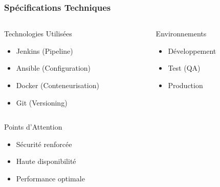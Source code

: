 \documentclass[aspectratio=169]{beamer}
\begin{document}
\begin{frame}
    \frametitle{Spécifications Techniques}
    \begin{columns}[t]
        \begin{column}{0.5\textwidth}
            \begin{block}{Technologies Utilisées}
                \begin{itemize}
                    \item Jenkins (Pipeline)
                    \item Ansible (Configuration)
                    \item Docker (Conteneurisation)
                    \item Git (Versioning)
                \end{itemize}
            \end{block}
        \end{column}
        \begin{column}{0.5\textwidth}
            \begin{block}{Environnements}
                \begin{itemize}
                    \item Développement
                    \item Test (QA)
                    \item Production
                \end{itemize}
            \end{block}
        \end{column}
    \end{columns}
    \vspace{0.3cm}
    \begin{alertblock}{Points d'Attention}
        \begin{itemize}
            \item Sécurité renforcée
            \item Haute disponibilité
            \item Performance optimale
        \end{itemize}
    \end{alertblock}
\end{frame}
\end{document}
